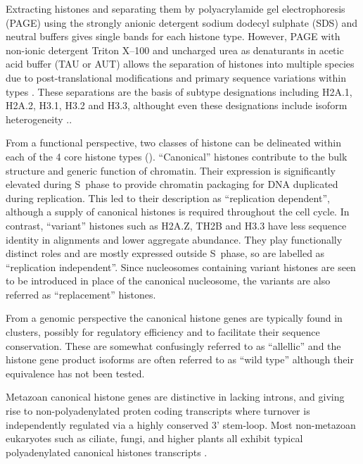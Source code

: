   Extracting histones and separating them by polyacrylamide gel electrophoresis (PAGE) 
  using the strongly anionic detergent sodium dodecyl sulphate (SDS) and neutral buffers 
  gives single bands for each histone type. 
  However, PAGE with non-ionic detergent Triton X--100 and uncharged urea as denaturants
  in acetic acid buffer (TAU or AUT) allows the separation of histones into multiple species 
  due to post-translational modifications and primary sequence variations within types \citep{PAGEND}. 
  These separations are the basis of subtype designations including H2A.1, H2A.2, H3.1, H3.2 and H3.3, 
  althought even these designations include isoform heterogeneity \addref{}..

  From a functional perspective, two classes of histone can be delineated 
  within each of the 4 core histone types (). 
  ``Canonical'' histones contribute to the bulk structure and generic function of chromatin. 
  Their expression is significantly elevated during S~phase to provide chromatin packaging 
  for DNA duplicated during replication. This led to their description as ``replication dependent'', 
  although a supply of canonical histones is required throughout the cell cycle. 
  In contrast, ``variant'' histones such as H2A.Z, TH2B and H3.3 
  have less sequence identity in alignments and lower aggregate abundance. 
  They play functionally distinct roles and are mostly expressed outside S~phase, 
  so are labelled as ``replication independent''. 
  Since nucleosomes containing variant histones are seen to be introduced in place of the canonical nucleosome, 
  the variants are also referred as ``replacement'' histones.
  
  From a genomic perspective the canonical histone genes are typically found in  clusters, 
  possibly for regulatory efficiency and to facilitate their sequence conservation. 
  These are somewhat confusingly referred to as ``allellic'' 
  and the histone gene product isoforms are often referred to as ``wild type'' 
  although their equivalence has not been tested.
  
  Metazoan canonical histone genes are distinctive in lacking introns, 
  and giving rise to non-polyadenylated proten coding transcripts 
  where turnover is independently regulated via a highly conserved 3' stem-loop. 
  Most non-metazoan eukaryotes such as ciliate, fungi, and higher plants 
  all exhibit typical polyadenylated canonical histones transcripts \addref{}.

